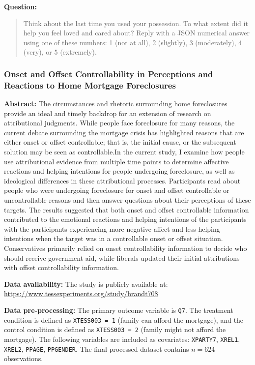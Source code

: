 \begin{tcolorbox}[
    title=Example Prompt ,
    width=\textwidth,
    colback=white,
    colframe=pierCite,
    left=5pt,
    right=5pt,
    top=5pt,
    bottom=5pt
]
\textbf{Question:}
\begin{quotation}
Think about the last time you used your possession. To what extent did it help you feel loved and cared about?
Reply with a JSON numerical answer using one of these numbers:
1 (not at all), 2 (slightly), 3 (moderately), 4 (very), or 5 (extremely).
\end{quotation}
\end{tcolorbox}

\subsubsection{Onset and Offset Controllability in Perceptions and Reactions to Home Mortgage Foreclosures~\citep{brandt2013onset}} 

\textbf{Abstract:} The circumstances and rhetoric surrounding home foreclosures provide an ideal and timely backdrop for an extension of research on attributional judgments. While people face foreclosure for many reasons, the current debate surrounding the mortgage crisis has highlighted reasons that are either onset or offset controllable; that is, the initial cause, or the subsequent solution may be seen as controllable.In the current study, I examine how people use attributional evidence from multiple time points to determine affective reactions and helping intentions for people undergoing foreclosure, as well as ideological differences in these attributional processes. Participants read about people who were undergoing foreclosure for onset and offset controllable or uncontrollable reasons and then answer questions about their perceptions of these targets. The results suggested that both onset and offset controllable information contributed to the emotional reactions and helping intentions of the participants with the participants experiencing more negative affect and less helping intentions when the target was in a controllable onset or offset situation. Conservatives primarily relied on onset controllability information to decide who should receive government aid, while liberals updated their initial attributions with offset controllability information.

\textbf{Data availability:}  The study is publicly available at: \url{https://www.tessexperiments.org/study/brandt708}

\textbf{Data pre-processing:} The primary outcome variable is \texttt{Q7}. The treatment condition is defined as \texttt{XTESS003 = 1} (family can afford the mortgage), and the control condition is defined as \texttt{XTESS003 = 2} (family might not afford the mortgage). The following variables are included as covariates: \texttt{XPARTY7}, \texttt{XREL1}, \texttt{XREL2}, \texttt{PPAGE}, \texttt{PPGENDER}. The final processed dataset contains $n=624$ observations.

